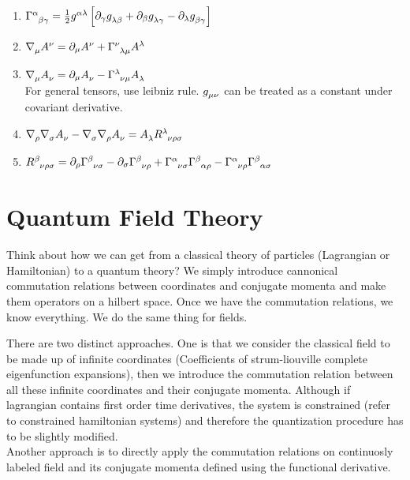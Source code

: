 \documentclass{report}
\begin{document}
\begin{itemize}
\begin{enumerate}
      \item $\Gamma\indices{^\alpha_ \beta_ \gamma} = \frac{1}{2}g\indices{^\alpha^\lambda}\left[\partial_ \gamma g\indices{_ \lambda_ \beta} + \partial_ \beta g\indices{_\lambda_ \gamma}-\partial_\lambda g\indices{_ \beta_ \gamma}\right]$
      \item
        $\nabla\indices{_\mu}A\indices{^\nu} = \partial_{\mu}A\indices{^\nu} + \Gamma\indices{^\nu_\lambda_\mu}A\indices{^\lambda}$
      \item
        $\nabla\indices{_\mu}A\indices{_\nu} = \partial_{\mu}A\indices{_\nu} - \Gamma\indices{^\lambda_\nu_\mu}A\indices{_\lambda}$ \\
        For general tensors, use leibniz rule. $g\indices{_\mu_\nu}$ can be treated as a constant under covariant derivative.

      \item $\nabla\indices{_ \rho}\nabla\indices{_\sigma}A\indices{_\nu} - \nabla\indices{_\sigma}\nabla\indices{_ \rho}A\indices{_ \nu} = A\indices{_ \lambda}R\indices{^\lambda_\nu_ \rho_\sigma}$

      \item $R\indices{^\beta_\nu_ \rho_\sigma} = \partial_ {\rho}\Gamma\indices{^\beta_\nu_\sigma}-\partial_ {\sigma}\Gamma\indices{^\beta_\nu_\rho} + \Gamma\indices{^\alpha_\nu_\sigma} \Gamma\indices{^\beta_ \alpha_ \rho} - \Gamma\indices{^\alpha_\nu_ \rho} \Gamma\indices{^\beta_ \alpha_ \sigma}$

    \end{enumerate}
\end{itemize}

\chapter{Quantum Field Theory}

\noindent Think about how we can get from a classical theory of particles (Lagrangian or Hamiltonian) to a quantum theory? We simply introduce cannonical commutation relations between coordinates and conjugate momenta and make them operators on a hilbert space. Once we have the commutation relations, we know everything. We do the same thing for fields. 

\noindent There are two distinct approaches. One is that we consider the classical field to be made up of infinite coordinates (Coefficients of strum-liouville complete eigenfunction expansions), then we introduce the commutation relation between all these infinite coordinates and their conjugate momenta. Although if lagrangian contains first order time derivatives, the system is constrained (refer to constrained hamiltonian systems) and therefore the quantization procedure has to be slightly modified.\\
Another approach is to directly apply the commutation relations on continuosly labeled field and its conjugate momenta defined using the functional derivative.
\end{document}
